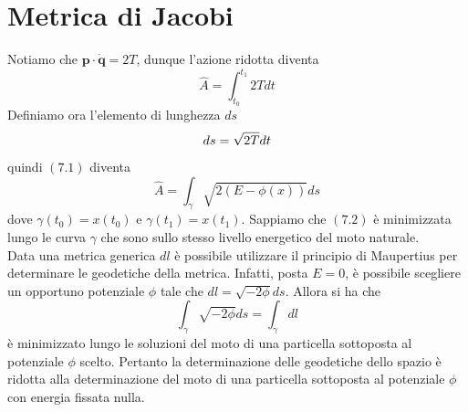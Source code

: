 \documentclass{article}
\begin{document}
\newpage
\section{Metrica di Jacobi}
Notiamo che $\mathbf{p} \cdot \mathbf{\dot{q}} = 2T$, dunque l'azione ridotta diventa
\begin{equation}
    \hat{A} = \int_{t_0}^{t_1} 2Tdt \tag{7.1}
\end{equation}
Definiamo ora l'elemento di lunghezza $ds$
\begin{equation}
    ds = \sqrt{2T}dt \notag
\end{equation}
quindi $(7.1)$ diventa
\begin{equation}
    \hat{A} = \int_\gamma \sqrt{2\left( E - \phi(x) \right)}ds \tag{7.2}
\end{equation}
dove $\gamma(t_0) = x(t_0)$ e $\gamma(t_1) = x(t_1)$. Sappiamo che $(7.2)$ è minimizzata lungo le curva $\gamma$ che sono sullo stesso livello energetico del moto naturale. \\
Data una metrica generica $dl$ è possibile utilizzare il principio di Maupertius per determinare le geodetiche della metrica. Infatti, posta $E = 0$, è possibile scegliere un opportuno potenziale $\phi$ tale che $dl = \sqrt{-2\phi} ds$. Allora si ha che
\begin{equation}
    \int_\gamma \sqrt{-2\phi} ds = \int_\gamma dl \tag{7.3}
\end{equation}
è minimizzato lungo le soluzioni del moto di una particella sottoposta al potenziale $\phi$ scelto. Pertanto la determinazione delle geodetiche dello spazio è ridotta alla determinazione del moto di una particella sottoposta al potenziale $\phi$ con energia fissata nulla.

\newpage
\end{document}
